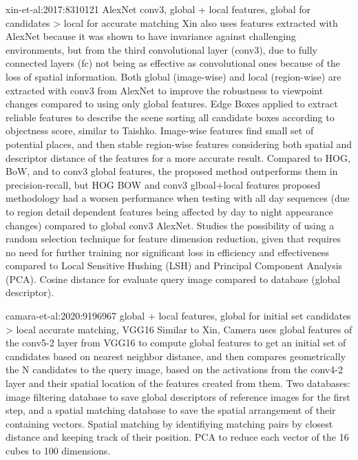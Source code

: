 
xin-et-al:2017:8310121 AlexNet conv3, global + local features, global for candidates > local for accurate matching
Xin also uses features extracted with AlexNet because it was shown to have invariance against challenging environments, but from the third convolutional layer (conv3), due to fully connected layers (fc) not being as effective as convolutional ones because of the loss of spatial information. Both global (image-wise) and local (region-wise) are extracted with conv3 from AlexNet to improve the robustness to viewpoint changes compared to using only global features. Edge Boxes applied to extract reliable features to describe the scene sorting all candidate boxes according to objectness score, similar to Taishko. Image-wise features find small set of potential places, and then stable region-wise features considering both spatial and descriptor distance of the features for a more accurate result.
Compared to HOG, BoW, and to conv3 global features, the proposed method outperforms them in precision-recall, but HOG BOW and conv3 glboal+local features proposed methodology had a worsen performance when testing with all day sequences (due to region detail dependent features being affected by day to night appearance changes) compared to global conv3 AlexNet.
Studies the possibility of using a random selection technique for feature dimension reduction, given that requires no need for further training nor significant loss in efficiency and effectiveness compared to Local Sensitive Hushing (LSH) and Principal Component Analysis (PCA).
Cosine distance for evaluate query image compared to database (global descriptor).

camara-et-al:2020:9196967 global + local features, global for initial set candidates > local accurate matching, VGG16
Similar to Xin, Camera uses global features of the conv5-2 layer from VGG16 to compute global features to get an initial set of candidates based on nearest neighbor distance, and then compares geometrically the N candidates to the query image, based on the activations from the conv4-2 layer and their spatial location of the features created from them. Two databases: image filtering database to save global descriptors of reference images for the first step, and a spatial matching database to save the spatial arrangement of their containing vectors. Spatial matching by identifiying matching pairs by closest distance and keeping track of their position.
PCA to reduce each vector of the 16 cubes to 100 dimensions.



